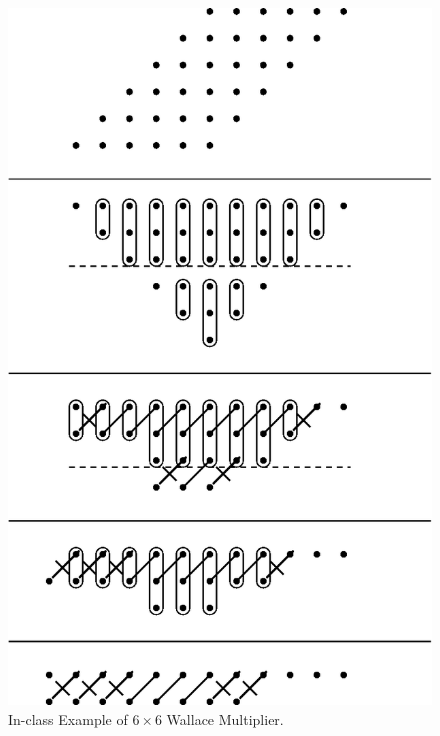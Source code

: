\documentclass{article}
\begin{document}
  \begin{figure}
    \begin{center}
      \includegraphics[scale=1.0]{wallace6.eps}
    \end{center}
    \label{wallace6.fig}
    \caption{In-class Example of $6 \times 6$ Wallace Multiplier.}
  \end{figure}
\end{document}
